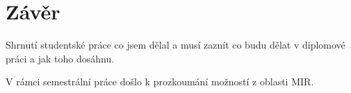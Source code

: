 \chapter*{Závěr}
{}

Shrnutí studentské práce co jsem dělal a musí zaznít co budu dělat v diplomové práci a jak toho dosáhnu.


V rámci semestrální práce došlo k prozkoumání možností z oblasti \acs{MIR}.
